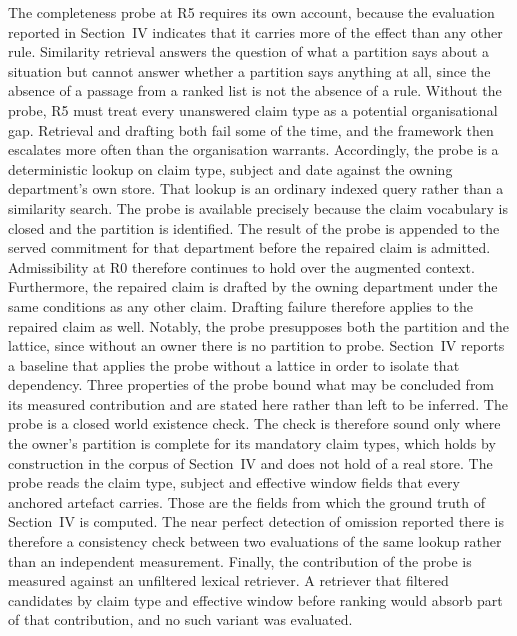 \documentclass[journal]{IEEEtran}
\begin{document}
The completeness probe at R5 requires its own account, because the evaluation reported in Section~IV indicates that it carries more of the effect than any other rule. Similarity retrieval answers the question of what a partition says about a situation but cannot answer whether a partition says anything at all, since the absence of a passage from a ranked list is not the absence of a rule. Without the probe, R5 must treat every unanswered claim type as a potential organisational gap. Retrieval and drafting both fail some of the time, and the framework then escalates more often than the organisation warrants. Accordingly, the probe is a deterministic lookup on claim type, subject and date against the owning department's own store. That lookup is an ordinary indexed query rather than a similarity search. The probe is available precisely because the claim vocabulary is closed and the partition is identified. The result of the probe is appended to the served commitment for that department before the repaired claim is admitted. Admissibility at R0 therefore continues to hold over the augmented context. Furthermore, the repaired claim is drafted by the owning department under the same conditions as any other claim. Drafting failure therefore applies to the repaired claim as well. Notably, the probe presupposes both the partition and the lattice, since without an owner there is no partition to probe. Section~IV reports a baseline that applies the probe without a lattice in order to isolate that dependency. Three properties of the probe bound what may be concluded from its measured contribution and are stated here rather than left to be inferred. The probe is a closed world existence check. The check is therefore sound only where the owner's partition is complete for its mandatory claim types, which holds by construction in the corpus of Section~IV and does not hold of a real store. The probe reads the claim type, subject and effective window fields that every anchored artefact carries. Those are the fields from which the ground truth of Section~IV is computed. The near perfect detection of omission reported there is therefore a consistency check between two evaluations of the same lookup rather than an independent measurement. Finally, the contribution of the probe is measured against an unfiltered lexical retriever. A retriever that filtered candidates by claim type and effective window before ranking would absorb part of that contribution, and no such variant was evaluated.
\end{document}
